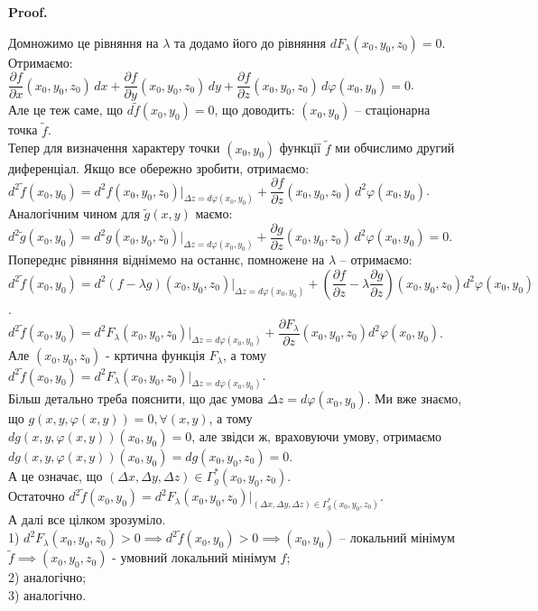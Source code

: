 \documentclass[a4paper, 10pt]{article}
\makeatletter
\def\departial#1#2{\dfrac{\partial {#1}}{\partial {#2}}}
\def\qed{$\blacksquare$}
\theoremstyle{theoremdd}
\theoremstyle{theoremdd}
\theoremstyle{theoremdd}
\theoremstyle{theoremdd}
\theoremstyle{theoremdd}
\theoremstyle{theoremdd}
\theoremstyle{theoremdd}
\theoremstyle{theoremdd}
\theoremstyle{theoremdd}
\renewenvironment{proof}[1][Proof.\\]{\par
\pushQED{\hfill \qed}%
\normalfont \topsep6\p@\@plus6\p@\relax
\trivlist
\item\relax
{\bfseries
#1\@addpunct{.}}\hspace\labelsep\ignorespaces
}{%
\popQED\endtrivlist\@endpefalse
}
\makeatother
\begin{document}
\begin{proof}
Домножимо це рівняння на $\lambda$ та додамо його до рівняння $dF_\lambda(x_0,y_0,z_0) = 0$. Отримаємо:\\
$\departial{f}{x}(x_0,y_0,z_0)\,dx + \departial{f}{y}(x_0,y_0,z_0)\,dy + \departial{f}{z}(x_0,y_0,z_0)\,d\varphi(x_0,y_0) = 0$.\\
Але це теж саме, що $d\tilde{f}(x_0,y_0) = 0$, що доводить: $(x_0,y_0)$ -- стаціонарна точка $\tilde{f}$.
\bigskip \\
Тепер для визначення характеру точки $(x_0,y_0)$ функції $\tilde{f}$ ми обчислимо другий диференціал. Якщо все обережно зробити, отримаємо:\\
$d^2 \tilde{f}(x_0,y_0) = d^2 f(x_0,y_0,z_0)|_{\Delta z = d\varphi(x_0,y_0)} + \departial{f}{z}(x_0,y_0,z_0) \, d^2\varphi(x_0,y_0)$.\\
Аналогічним чином для $\tilde{g}(x,y)$ маємо:\\
$d^2 \tilde{g}(x_0,y_0) = d^2 g(x_0,y_0,z_0)|_{\Delta z = d\varphi(x_0,y_0)} + \departial{g}{z}(x_0,y_0,z_0)\, d^2\varphi(x_0,y_0) = 0$.\\
Попереднє рівняння віднімемо на останнє, помножене на $\lambda$ -- отримаємо:\\
$d^2 \tilde{f}(x_0,y_0) = d^2 (f-\lambda g)(x_0,y_0,z_0)|_{\Delta z = d\varphi(x_0,y_0)} + \left( \departial{f}{z} - \lambda \departial{g}{z} \right)(x_0,y_0,z_0) d^2 \varphi(x_0,y_0)$.\\
$d^2 \tilde{f}(x_0,y_0) = d^2 F_\lambda (x_0,y_0,z_0) |_{\Delta z = d\varphi(x_0,y_0)} + \departial{F_\lambda}{z}(x_0,y_0,z_0) d^2 \varphi(x_0,y_0)$.\\
Але $(x_0,y_0,z_0)$ - кртична функція $F_\lambda$, а тому\\
$d^2 \tilde{f}(x_0,y_0) = d^2 F_\lambda(x_0,y_0,z_0) |_{\Delta z = d\varphi(x_0,y_0)}$.\\
Більш детально треба пояснити, що дає умова $\Delta z = d\varphi(x_0,y_0)$. Ми вже знаємо, що $g(x,y,\varphi(x,y)) = 0, \forall (x,y)$, а тому\\
$dg(x,y,\varphi(x,y))(x_0,y_0) = 0$, але звідси ж, враховуючи умову, отримаємо\\
$dg(x,y,\varphi(x,y))(x_0,y_0) = dg(x_0,y_0,z_0) = 0$.\\
А це означає, що $(\Delta x, \Delta y, \Delta z) \in \Gamma_g^*(x_0,y_0,z_0)$.\\
Остаточно $d^2 \tilde{f}(x_0,y_0) = d^2 F_\lambda(x_0,y_0,z_0) |_{(\Delta x, \Delta y, \Delta z) \in \Gamma_g^*(x_0,y_0,z_0)}$.\\
А далі все цілком зрозуміло.\\
1) $d^2 F_\lambda(x_0,y_0,z_0) > 0 \implies d^2 \tilde{f}(x_0,y_0) > 0 \implies (x_0,y_0)$ -- локальний мінімум $\tilde{f} \implies (x_0,y_0,z_0)$ - умовний локальний мінімум $f$;\\
2) аналогічно;\\
3) аналогічно.
\end{proof}
\end{document}
